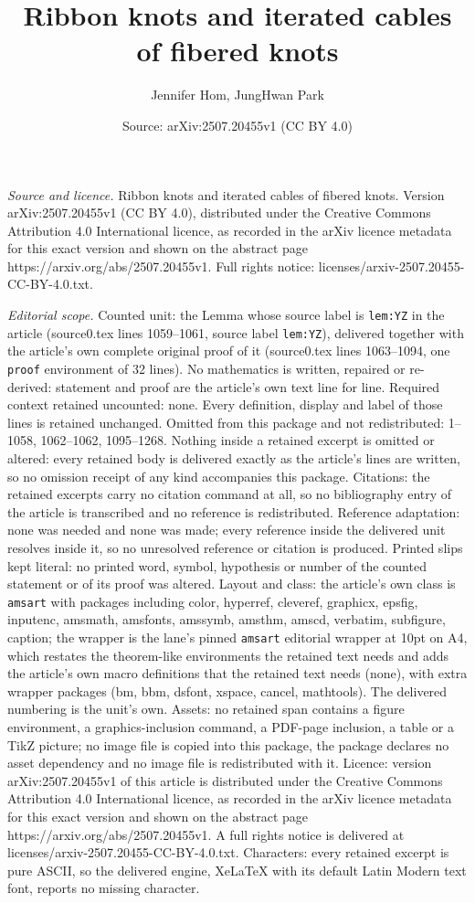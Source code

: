 \documentclass[10pt,a4paper]{amsart}
\title[Ribbon knots and iterated cables of fibered knots]{Ribbon knots and iterated cables of fibered knots}
\author{Jennifer Hom, JungHwan Park}
\date{Source: arXiv:2507.20455v1 (CC BY 4.0)}
\begin{document}
\maketitle

\noindent\emph{Source and licence.} Ribbon knots and iterated cables of fibered knots. Version arXiv:2507.20455v1 (CC BY 4.0), distributed under the Creative Commons Attribution 4.0 International licence, as recorded in the arXiv licence metadata for this exact version and shown on the abstract page https://arxiv.org/abs/2507.20455v1. Full rights notice: licenses/arxiv-2507.20455-CC-BY-4.0.txt.\par\smallskip

\noindent\textit{Editorial scope.} Counted unit: the Lemma whose source label is \texttt{lem:YZ} in the article (source0.tex lines 1059--1061, source label \texttt{lem:YZ}), delivered together with the article's own complete original proof of it (source0.tex lines 1063--1094, one \texttt{proof} environment of 32 lines). No mathematics is written, repaired or re-derived: statement and proof are the article's own text line for line. Required context retained uncounted: none. Every definition, display and label of those lines is retained unchanged. Omitted from this package and not redistributed: 1--1058, 1062--1062, 1095--1268. Nothing inside a retained excerpt is omitted or altered: every retained body is delivered exactly as the article's lines are written, so no omission receipt of any kind accompanies this package. Citations: the retained excerpts carry no citation command at all, so no bibliography entry of the article is transcribed and no reference is redistributed. Reference adaptation: none was needed and none was made; every reference inside the delivered unit resolves inside it, so no unresolved reference or citation is produced. Printed slips kept literal: no printed word, symbol, hypothesis or number of the counted statement or of its proof was altered. Layout and class: the article's own class is \texttt{amsart} with packages including color, hyperref, cleveref, graphicx, epsfig, inputenc, amsmath, amsfonts, amssymb, amsthm, amscd, verbatim, subfigure, caption; the wrapper is the lane's pinned \texttt{amsart} editorial wrapper at 10pt on A4, which restates the theorem-like environments the retained text needs and adds the article's own macro definitions that the retained text needs (none), with extra wrapper packages (bm, bbm, dsfont, xspace, cancel, mathtools). The delivered numbering is the unit's own. Assets: no retained span contains a figure environment, a graphics-inclusion command, a PDF-page inclusion, a table or a TikZ picture; no image file is copied into this package, the package declares no asset dependency and no image file is redistributed with it. Licence: version arXiv:2507.20455v1 of this article is distributed under the Creative Commons Attribution 4.0 International licence, as recorded in the arXiv licence metadata for this exact version and shown on the abstract page https://arxiv.org/abs/2507.20455v1. A full rights notice is delivered at licenses/arxiv-2507.20455-CC-BY-4.0.txt. Characters: every retained excerpt is pure ASCII, so the delivered engine, XeLaTeX with its default Latin Modern text font, reports no missing character.
\end{document}
